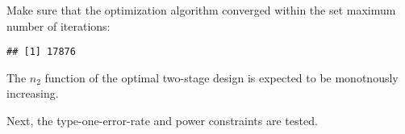 \documentclass[]{book}
\newenvironment{Shaded}{\begin{snugshade}}{\end{snugshade}}
\newcommand{\DecValTok}[1]{\textcolor[rgb]{0.00,0.00,0.81}{#1}}
\newcommand{\KeywordTok}[1]{\textcolor[rgb]{0.13,0.29,0.53}{\textbf{#1}}}
\newcommand{\NormalTok}[1]{#1}
\newcommand{\OperatorTok}[1]{\textcolor[rgb]{0.81,0.36,0.00}{\textbf{#1}}}
\newcommand{\StringTok}[1]{\textcolor[rgb]{0.31,0.60,0.02}{#1}}
\begin{document}
Make sure that the optimization algorithm converged within the set
maximum number of iterations:

\begin{Shaded}
\end{Shaded}

\begin{verbatim}
## [1] 17876
\end{verbatim}

The \(n_2\) function of the optimal two-stage design is expected to be
monotnously increasing.

\begin{Shaded}
\end{Shaded}

Next, the type-one-error-rate and power constraints are tested.
\end{document}

